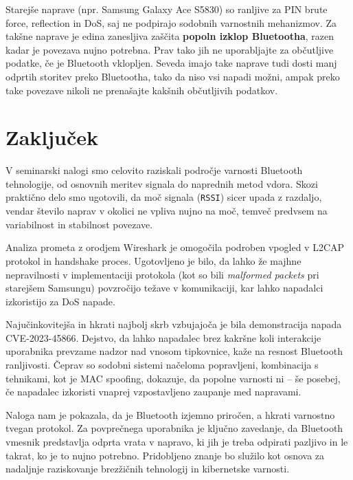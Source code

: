 \documentclass[11pt,a4paper,slovene]{article}
\begin{document}
Starejše naprave (npr. Samsung Galaxy Ace S5830) so ranljive za PIN brute force, reflection in DoS, saj ne podpirajo sodobnih varnostnih mehanizmov. Za takšne naprave je edina zanesljiva zaščita \textbf{popoln izklop Bluetootha}, razen kadar je povezava nujno potrebna. Prav tako jih ne uporabljajte za občutljive podatke, če je Bluetooth vklopljen. Seveda imajo take naprave tudi dosti manj odprtih storitev preko Bluetootha, tako da niso vsi napadi možni, ampak preko take povezave nikoli ne prenašajte kakšnih občutljivih podatkov.

\newpage

\section{Zaključek}
V seminarski nalogi smo celovito raziskali področje varnosti Bluetooth tehnologije, od osnovnih meritev signala do naprednih metod vdora. Skozi praktično delo smo ugotovili, da moč signala (\texttt{RSSI}) sicer upada z razdaljo, vendar število naprav v okolici ne vpliva nujno na moč, temveč predvsem na variabilnost in stabilnost povezave.

Analiza prometa z orodjem Wireshark je omogočila podroben vpogled v L2CAP protokol in handshake proces. Ugotovljeno je bilo, da lahko že majhne nepravilnosti v implementaciji protokola (kot so bili \textit{malformed packets} pri starejšem Samsungu) povzročijo težave v komunikaciji, kar lahko napadalci izkoristijo za DoS napade.

Najučinkovitejša in hkrati najbolj skrb vzbujajoča je bila demonstracija napada CVE-2023-45866. Dejstvo, da lahko napadalec brez kakršne koli interakcije uporabnika prevzame nadzor nad vnosom tipkovnice, kaže na resnost Bluetooth ranljivosti. Čeprav so sodobni sistemi načeloma popravljeni, kombinacija s tehnikami, kot je MAC spoofing, dokazuje, da popolne varnosti ni – še posebej, če napadalec izkoristi vnaprej vzpostavljeno zaupanje med napravami.

Naloga nam je pokazala, da je Bluetooth izjemno priročen, a hkrati varnostno tvegan protokol. Za povprečnega uporabnika je ključno zavedanje, da Bluetooth vmesnik predstavlja odprta vrata v napravo, ki jih je treba odpirati pazljivo in le takrat, ko je to nujno potrebno. Pridobljeno znanje bo služilo kot osnova za nadaljnje raziskovanje brezžičnih tehnologij in kibernetske varnosti.

\pagebreak
\nocite{*}


\end{document}
